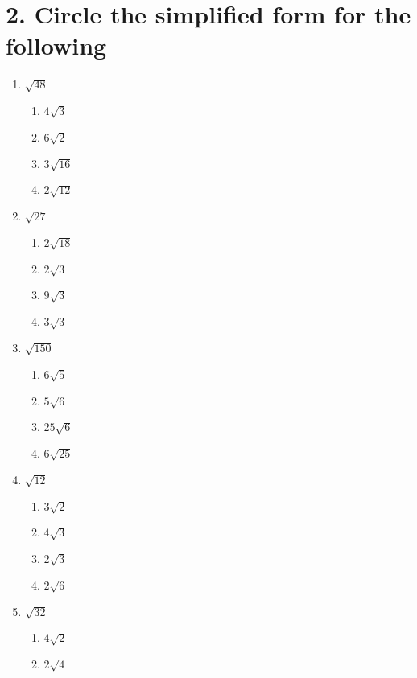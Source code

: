 \documentclass{hw}
\begin{document}
\section*{\normalsize 2. Circle the simplified form for the following}
\begin{enumerate}[label=\alph*.]
    \item $\sqrt{48}$
        \begin{enumerate}[label=\Alph*.]
            \item $4\sqrt{3}$
            \item $6\sqrt{2}$
            \item $3\sqrt{16}$
            \item $2\sqrt{12}$
        \end{enumerate}
        \studentworkspace
    \item $\sqrt{27}$
        \begin{enumerate}[label=\Alph*.]
            \item $2\sqrt{18}$
            \item $2\sqrt{3}$
            \item $9\sqrt{3}$
            \item $3\sqrt{3}$
        \end{enumerate}
        \studentworkspace
    \item $\sqrt{150}$
        \begin{enumerate}[label=\Alph*.]
            \item $6\sqrt{5}$
            \item $5\sqrt{6}$
            \item $25\sqrt{6}$
            \item $6\sqrt{25}$
        \end{enumerate}
        \studentworkspace
    \item $\sqrt{12}$
        \begin{enumerate}[label=\Alph*.]
            \item $3\sqrt{2}$
            \item $4\sqrt{3}$
            \item $2\sqrt{3}$
            \item $2\sqrt{6}$
        \end{enumerate}
        \studentworkspace
    \item $\sqrt{32}$
        \begin{enumerate}[label=\Alph*.]
            \item $4\sqrt{2}$
            \item $2\sqrt{4}$

\end{enumerate}
\end{enumerate}
\end{document}
